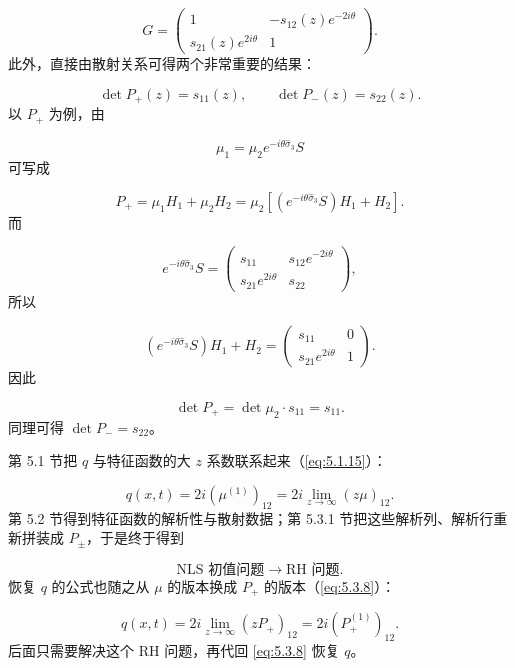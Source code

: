 \documentclass[
    lang=cn,
    scheme=chinese,
    mode=simple,
    device=normal,
    color=blue,
    math=cm,
    thmcnt=section,
    12pt
]{elegantbook}
\begin{document}
\begin{callout}
    \[
        G=
        \begin{pmatrix}
            1                     & -s_{12}(z)e^{-2i\theta} \\
            s_{21}(z)e^{2i\theta} & 1
        \end{pmatrix}.
    \]
    此外，直接由散射关系可得两个非常重要的结果：

    \[
        \det P_+(z)=s_{11}(z),
        \qquad
        \det P_-(z)=s_{22}(z).
    \]
    以 $P_+$ 为例，由

    \[
        \mu_1
        =
        \mu_2e^{-i\theta\widehat{\sigma}_3}S
    \]
    可写成

    \[
        P_+
        =
        \mu_1H_1+\mu_2H_2
        =
        \mu_2
        \left[
            \left(e^{-i\theta\widehat{\sigma}_3}S\right)H_1+H_2
            \right].
    \]
    而

    \[
        e^{-i\theta\widehat{\sigma}_3}S
        =
        \begin{pmatrix}
            s_{11}             & s_{12}e^{-2i\theta} \\
            s_{21}e^{2i\theta} & s_{22}
        \end{pmatrix},
    \]
    所以

    \[
        \left(e^{-i\theta\widehat{\sigma}_3}S\right)H_1+H_2
        =
        \begin{pmatrix}
            s_{11}             & 0 \\
            s_{21}e^{2i\theta} & 1
        \end{pmatrix}.
    \]
    因此

    \[
        \det P_+
        =
        \det\mu_2\cdot s_{11}
        =
        s_{11}.
    \]
    同理可得 $\det P_-=s_{22}$。
\end{callout}

\begin{callout}[到这里发生了什么？]
    第 5.1 节把 $q$ 与特征函数的大 $z$ 系数联系起来（\eqref{eq:5.1.15}）：

    \[
        q(x,t)=2i(\mu^{(1)})_{12}=2i\lim\limits_{z\to\infty}(z\mu)_{12}.
    \]
    第 5.2 节得到特征函数的解析性与散射数据；第 5.3.1 节把这些解析列、解析行重新拼装成 $P_\pm$，于是终于得到

    \[
        \boxed{\text{NLS 初值问题}\longrightarrow\text{RH 问题}.}
    \]
    恢复 $q$ 的公式也随之从 $\mu$ 的版本换成 $P_+$ 的版本（\eqref{eq:5.3.8}）：

    \[
        q(x,t)=2i\lim\limits_{z\to\infty}(zP_+)_{12}=2i(P_+^{(1)})_{12}.
    \]
    后面只需要解决这个 RH 问题，再代回 \eqref{eq:5.3.8} 恢复 $q$。
\end{callout}
\end{document}
